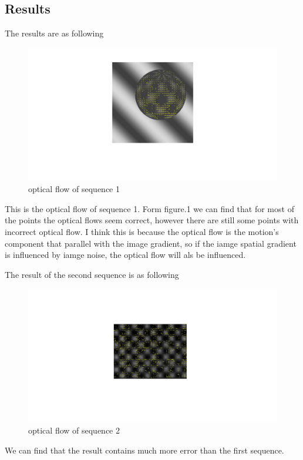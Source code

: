 \documentclass{article}
\begin{document}
\subsection*{Results}
\par
The results are as following 
\begin{figure}[H]
\centering
\includegraphics[scale=0.2]{1.jpg}
\caption{optical flow of sequence 1}
\label{fig:label}
\end{figure}
This is the optical flow of sequence 1. Form figure.1 we can find that for most of the points the optical flows seem correct, however there are still some points with incorrect optical flow. I think this is because the optical flow is the motion's component that parallel with the image gradient, so if the iamge spatial gradient is influenced by iamge noise, the optical flow will als be influenced.
\par 
The result of the second sequence is as following 
\begin{figure}[H]
\centering
\includegraphics[scale=0.2]{2.jpg}
\caption{optical flow of sequence 2}
\label{fig:label}
\end{figure}
We can find that the result contains much more error than the first sequence.
\end{document}
